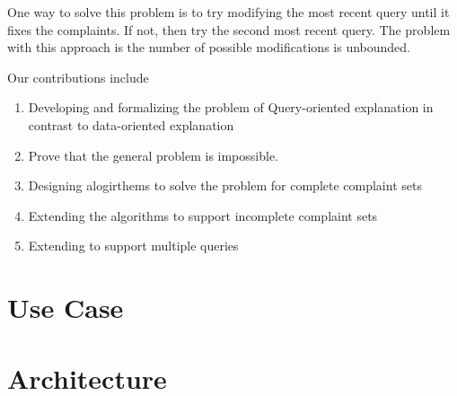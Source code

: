 One way to solve this problem is to try modifying the most recent query until it fixes the complaints.  
If not, then try the second most recent query.  
The problem with this approach is the number of possible modifications is unbounded.

Our contributions include

\begin{enumerate}
\item Developing and formalizing the problem of Query-oriented explanation in contrast to data-oriented explanation
\item Prove that the general problem is impossible.
\item Designing alogirthems to solve the problem for complete complaint sets
\item Extending the algorithms to support incomplete complaint sets
\item Extending to support multiple queries
\end{enumerate}



\section{Use Case}

\section{Architecture}









